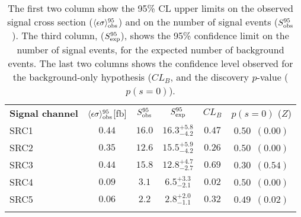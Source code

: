 
\begin{table}[!h]
\caption[95\% confidence limits on the observed cross section
($\langle\epsilon\sigma\rangle_{\rm obs}^{95}$) and on the number of
signal events ($S_{\rm obs}^{95}$ )]{
The first two column show the 95\% CL upper limits on the observed signal cross section
($\langle\epsilon\sigma\rangle_{\rm obs}^{95}$) and on the number of
signal events ($S_{\rm obs}^{95}$ ).  The third column,
($S_{\rm exp}^{95}$), shows the 95\% confidence limit on the number of
signal events, for the expected number of background events.
The last two columns shows the confidence level observed for
the background-only hypothesis ($CL_{B}$, and the discovery $p$-value ($p(s = 0)$). 
\label{table.results.exclxsec.pval.upperlimit}}
\centering
\setlength{\tabcolsep}{0.0pc}
\begin{tabular*}{\textwidth}{@{\extracolsep{\fill}}lccccc}
\noalign{\smallskip}\hline\noalign{\smallskip}
{\bf Signal channel}                        & $\langle\epsilon{\rm \sigma}\rangle_{\rm obs}^{95}$[fb]  &  $S_{\rm obs}^{95}$  & $S_{\rm exp}^{95}$ & $CL_{B}$ & $p(s=0)$ ($Z$)  \\
\noalign{\smallskip}\hline\noalign{\smallskip}
SRC1    & $0.44$ &  $16.0$ & $ { 16.3 }^{ +5.8 }_{ -4.2 }$ & $0.47$ &
 $ 0.50$~$(0.00)$ \\%
SRC2    & $0.35$ &  $12.6$ & $ { 15.5 }^{ +5.9 }_{ -4.2 }$ & $0.26$ &
$ 0.50$~$(0.00)$ \\%
SRC3    & $0.44$ &  $15.8$ & $ { 12.8 }^{ +4.7 }_{ -2.7 }$ & $0.69$ &
$ 0.30$~$(0.54)$ \\%
SRC4    & $0.09$ &  $3.1$ & $ { 6.5 }^{ +3.3 }_{ -2.1 }$ & $0.02$ & $
0.50$~$(0.00)$ \\%
SRC5    & $0.06$ &  $2.2$ & $ { 2.8 }^{ +2.0 }_{ -1.1 }$ & $0.32$ & $
0.49$~$(0.02)$ \\%

\noalign{\smallskip}\hline\noalign{\smallskip}
\end{tabular*}
\end{table}
%
